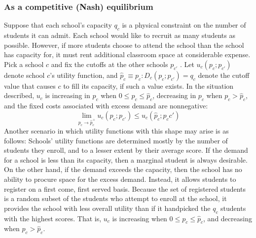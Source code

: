 \documentclass[12pt]{article}
\theoremstyle{definition}
\begin{document}
\subsubsection{As a competitive (Nash) equilibrium} \label{asacompeq}
Suppose that each school's capacity $q_c$ is a physical constraint on the number of students it can admit. Each school would like to recruit as many students as possible. However, if more students choose to attend the school than the school has capacity for, it must rent additional classroom space at considerable expense. Pick a school $c$ and fix the cutoffs at the other schools $p_{c'}$ . Let $u_c(p_c; p_{c'})$ denote school $c$'s utility function, and $\hat p_c \equiv p_c: D_c(p_c; p_{c'}) = q_c$ denote the cutoff value that causes $c$ to fill its capacity, if such a value exists. In the situation described, $u_c$ is increasing in $p_c$ when $0 \leq p_c \leq \hat p_c$, decreasing in $p_c$ when $p_c > \hat p_c$, and the fixed costs associated with excess demand are nonnegative: \[\lim_{p_c \to \hat p_c^+} u_c(p_c; p_{c'}) \leq  u_c(\hat p_c; p_c{c'})\]
Another scenario in which utility functions with this shape may arise is as follows: Schools' utility functions are determined mostly by the number of students they enroll, and to a lesser extent by their average score. If the demand for a school is less than its capacity, then a marginal student is always desirable. On the other hand, if the demand exceeds the capacity, then the school has no ability to procure space for the excess demand. Instead, it allows students to register on a first come, first served basis. Because the set of registered students is a random subset of the students who attempt to enroll at the school, it provides the school with less overall utility than if it handpicked the $q_c$ students with the highest scores. That is, $u_c$ is increasing when $0 \leq p_c \leq \hat p_c$, and decreasing when $p_c > \hat p_c$. 
\end{document}
